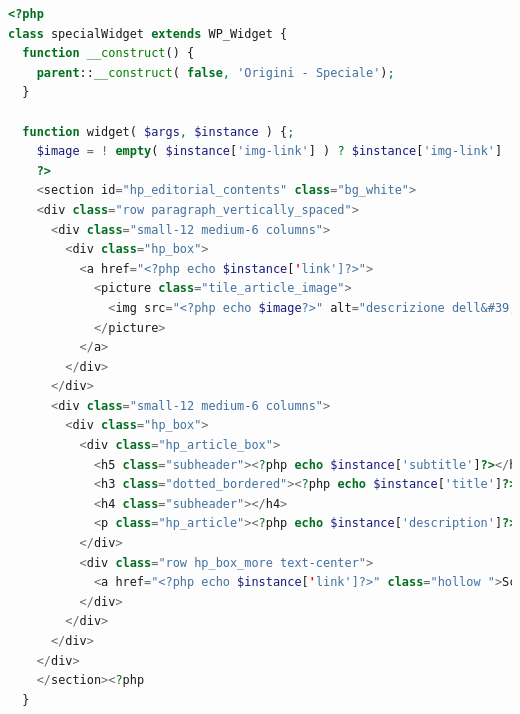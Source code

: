 \begin{lstlisting}[style=customphp, basicstyle=\tiny, language=Php,caption={Codice del widget \emph{Origini - Speciale}}] 
<?php
class specialWidget extends WP_Widget {
  function __construct() {
    parent::__construct( false, 'Origini - Speciale');
  }

  function widget( $args, $instance ) {;
    $image = ! empty( $instance['img-link'] ) ? $instance['img-link'] : '';
    ?>
    <section id="hp_editorial_contents" class="bg_white">
    <div class="row paragraph_vertically_spaced">
      <div class="small-12 medium-6 columns">
        <div class="hp_box">
          <a href="<?php echo $instance['link']?>">
            <picture class="tile_article_image">
              <img src="<?php echo $image?>" alt="descrizione dell&#39;immagine">
            </picture>
          </a>
        </div>
      </div>
      <div class="small-12 medium-6 columns">
        <div class="hp_box">
          <div class="hp_article_box">
            <h5 class="subheader"><?php echo $instance['subtitle']?></h5>
            <h3 class="dotted_bordered"><?php echo $instance['title']?></h3>
            <h4 class="subheader"></h4>
            <p class="hp_article"><?php echo $instance['description']?></p>
          </div>
          <div class="row hp_box_more text-center">
            <a href="<?php echo $instance['link']?>" class="hollow ">Scopri</a>
          </div>
        </div>
      </div>
    </div>
    </section><?php
  }


\end{lstlisting}
